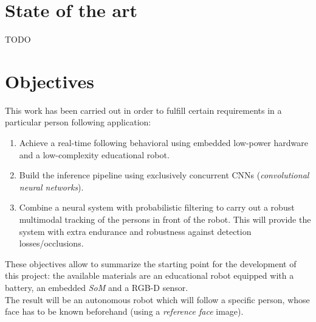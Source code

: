 	
	
\section{State of the art}
	TODO
	
	
\section{Objectives}
\label{sec:1_objectives}
	This work has been carried out in order to fulfill certain requirements in a particular person following application:
	
	\begin{enumerate}
		\item Achieve a real-time following behavioral using embedded low-power hardware and a low-complexity educational robot.
		
		\item Build the inference pipeline using exclusively concurrent CNNs (\textit{convolutional neural networks}).
		
		\item Combine a neural system with probabilistic filtering to carry out a robust multimodal tracking of the persons in front of the robot. This will provide the system with extra endurance and robustness against detection losses/occlusions.
	\end{enumerate}
	
These objectives allow to summarize the starting point for the development of this project: the available materials are an educational robot equipped with a battery, an embedded \textit{SoM} and a RGB-D sensor.\\

The result will be an autonomous robot which will follow a specific person, whose face has to be known beforehand (using a \textit{reference face} image).

